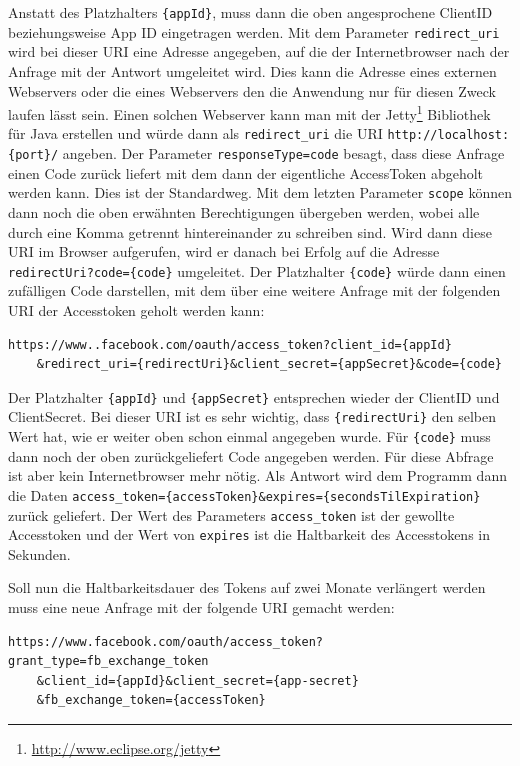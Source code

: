 Anstatt des Platzhalters \texttt{\{appId\}}, muss dann die oben angesprochene ClientID beziehungsweise App ID eingetragen werden. Mit dem Parameter \texttt{redirect\_uri} wird bei dieser URI eine Adresse angegeben, auf die der Internetbrowser nach der Anfrage mit der Antwort umgeleitet wird. Dies kann die Adresse eines externen Webservers oder die eines Webservers den die Anwendung nur für diesen Zweck laufen lässt sein. Einen solchen Webserver kann man mit der Jetty\footnote{\url{http://www.eclipse.org/jetty}} Bibliothek für Java erstellen und würde dann als \texttt{redirect\_uri} die URI \texttt{http://localhost:\{port\}/} angeben. Der Parameter \texttt{responseType=code} besagt, dass diese Anfrage einen Code zurück liefert mit dem dann der eigentliche AccessToken abgeholt werden kann. Dies ist der Standardweg. Mit dem letzten Parameter \texttt{scope} können dann noch die oben erwähnten Berechtigungen übergeben werden, wobei alle durch eine Komma getrennt hintereinander zu schreiben sind. Wird dann diese URI im Browser aufgerufen, wird er danach bei Erfolg auf die Adresse \texttt{{redirectUri}?code=\{code\}} umgeleitet. Der Platzhalter \texttt{\{code\}} würde dann einen zufälligen Code darstellen, mit dem über eine weitere Anfrage mit der folgenden URI der Accesstoken geholt werden kann:

\begin{lstlisting}[numbers=none, belowskip=-18pt]
https://www..facebook.com/oauth/access_token?client_id={appId}
    &redirect_uri={redirectUri}&client_secret={appSecret}&code={code}
\end{lstlisting}

Der Platzhalter \texttt{\{appId\}} und \texttt{\{appSecret\}} entsprechen wieder der ClientID und ClientSecret. Bei dieser URI ist es sehr wichtig, dass \texttt{\{redirectUri\}} den selben Wert hat, wie er weiter oben schon einmal angegeben wurde. Für \texttt{\{code\}} muss dann noch der oben zurückgeliefert Code angegeben werden. Für diese Abfrage ist aber kein Internetbrowser mehr nötig. Als Antwort wird dem Programm dann die Daten \texttt{access\_token=\{accessToken\}\&expires=\{secondsTilExpiration\}} zurück geliefert. Der Wert des Parameters \texttt{access\_token} ist der gewollte Accesstoken und der Wert von \texttt{expires} ist die Haltbarkeit des Accesstokens in Sekunden.

Soll nun die Haltbarkeitsdauer des Tokens auf zwei Monate verlängert werden muss eine neue Anfrage mit der folgende URI gemacht werden:

\begin{lstlisting}[numbers=none, belowskip=-18pt]
https://www.facebook.com/oauth/access_token?grant_type=fb_exchange_token
    &client_id={appId}&client_secret={app-secret}
    &fb_exchange_token={accessToken}
\end{lstlisting} 

